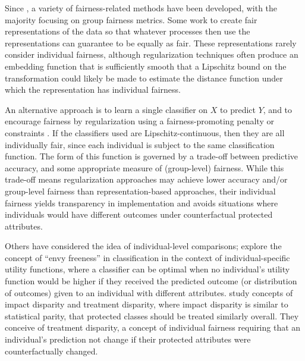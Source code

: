         Since \citet{dwork2012fairness}, a variety of fairness-related methods have been developed, with the majority focusing on group fairness metrics. Some work to create fair representations \citep{dwork2012fairness,ZemQiSwePitDwo2013,MadCrePitZem2018} of the data so that whatever processes then use the representations can guarantee to be equally as fair.  These representations rarely consider individual fairness, although regularization techniques often produce an embedding function that is sufficiently smooth that a Lipschitz bound on the transformation could likely be made to estimate the distance function under which the representation has individual fairness.
        
        An alternative approach is to learn a single classifier on $X$ to predict $Y$, and to encourage fairness by regularization using a fairness-promoting penalty \citep{KamAkaSak2011,KamAkHidSak2012,berk2017convex} or constraints \citep{zafar2017parity,zafar2017aistats,AgaBeyDudLanWal2018}. If the classifiers used are Lipschitz-continuous, then they are all individually fair, since each individual is subject to the same classification function. The form of this function is governed by a trade-off between predictive accuracy, and some appropriate measure of (group-level) fairness. While this trade-off means regularization approaches may achieve lower accuracy and/or group-level fairness than representation-based approaches, their individual fairness yields transparency in implementation and avoids situations where individuals would have different outcomes under counterfactual protected attributes.

        Others have considered the idea of individual-level comparisons; \citet{balcan2018} explore the concept of ``envy freeness'' in classification in the context of individual-specific utility functions, where a classifier can be optimal when no individual's utility function would be higher if they received the predicted outcome (or distribution of outcomes) given to an individual with different attributes. \citet{lipton2018treatmentdisparity} study concepts of impact disparity and treatment disparity, where impact disparity is similar to statistical parity, that protected classes should be treated similarly overall.  They conceive of treatment disparity, a concept of individual fairness requiring that an individual's prediction not change if their protected attributes were counterfactually changed.
